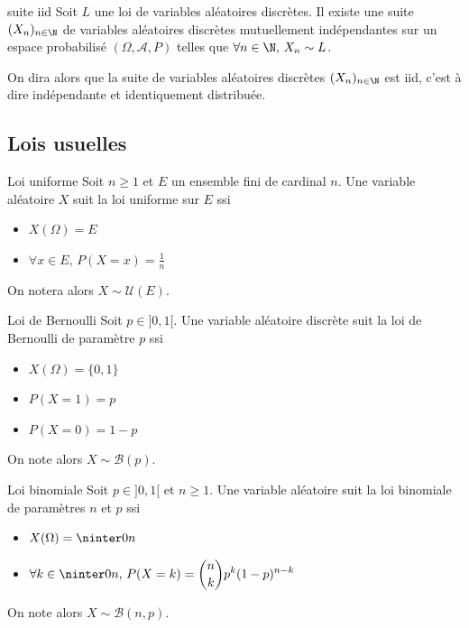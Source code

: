 \begin{corollaire}{suite iid}{}
    Soit $L$ une loi de variables aléatoires discrètes. Il existe une suite 
    $(X_n)_{n \in \N}$ de variables aléatoires discrètes mutuellement indépendantes
    sur un espace probabilisé $(\Omega, \mathcal A, P)$ telles que $\forall n \in \N, \, X_n \sim L$.

    On dira alors que la suite de variables aléatoires discrètes $(X_n)_{n \in \N}$ 
    est iid, c'est à dire indépendante et identiquement distribuée.
\end{corollaire}

\subsection{Lois usuelles}

\begin{definition}{Loi uniforme}{}
    Soit $n \geqslant 1$ et $E$ un ensemble fini de cardinal $n$. Une variable aléatoire $X$ suit la 
    loi uniforme sur $E$ ssi 
    \begin{itemize}
        \item $X(\Omega) = E$
        \item $\forall x \in E, \, P(X = x) = \frac 1 n$
    \end{itemize}

    On notera alors $X \sim \mathcal U(E)$.
\end{definition}


\begin{definition}{Loi de Bernoulli}{}
    Soit $p \in ]0, 1[$. Une variable aléatoire discrète suit la loi de Bernoulli de paramètre 
    $p$ ssi 
    \begin{itemize}
        \item $X(\Omega) = \{0, 1\}$
        \item $P(X = 1) = p$ 
        \item $P(X = 0) = 1 - p$
    \end{itemize}
    On note alors $X \sim \mathcal B(p)$.
\end{definition}

\begin{definition}{Loi binomiale}{}
    Soit $p \in ]0, 1[$ et $n \geqslant 1$. Une variable aléatoire suit la loi binomiale de 
    paramètres $n$ et $p$ ssi 
    \begin{itemize}
        \item $X(\Omega) = \ninter 0 n$
        \item $\displaystyle \forall k \in \ninter 0 n, \, P(X = k) = \binom n k p^k (1 - p)^{n - k}$
    \end{itemize}
    On note alors $X \sim \mathcal B(n, p)$.
\end{definition}

